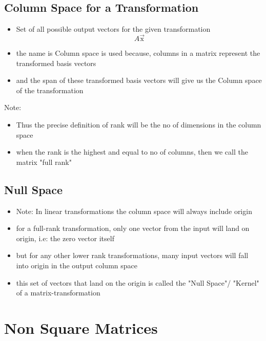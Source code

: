 \documentclass[a4paper]{article}
\begin{document}
\subsection{Column Space for a Transformation}
\begin{itemize}
	\item Set of all possible output vectors for the given transformation
	      \[
		      A \vec{\text{x}}
	      \]
	\item the name is Column space is used because,
	      columns in a matrix represent the transformed basis vectors
	\item and the span of these transformed basis vectors will give us the
	      Column space of the transformation
\end{itemize}

Note:
\begin{itemize}
	\item Thus the precise definition of rank will be the no of dimensions in
	      the column space
	\item  when the rank is the highest and equal to no of columns,
	      then we call the matrix "full rank"
\end{itemize}

\subsection{Null Space}
\begin{itemize}
	\item Note: In linear transformations the column space will always include
	      origin
	\item for a full-rank transformation, only one vector from the input
	      will land on origin, i.e: the zero vector itself
	\item but for any other lower rank transformations, many input
	      vectors will fall into origin in the output column space
	\item this set of vectors that land on the origin is called the
	      "Null Space"/ "Kernel" of a matrix-transformation
\end{itemize}


\newpage
\section{Non Square Matrices}
\end{document}

